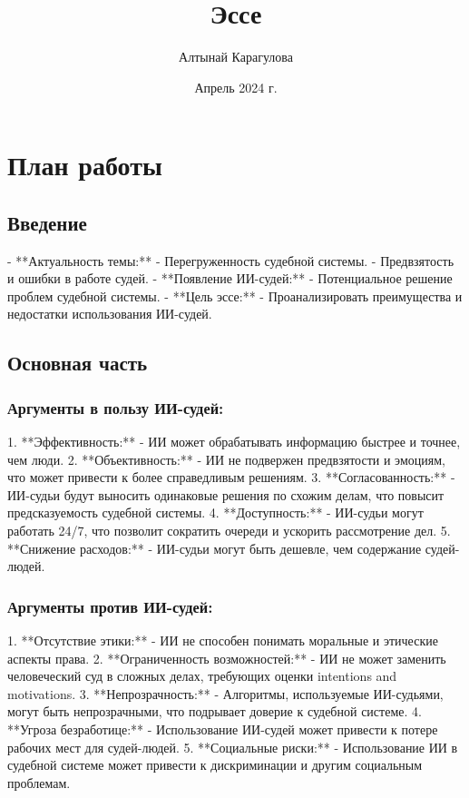 \documentclass{article}
\title{Эссе}
\author{Алтынай Карагулова}
\date{Апрель 2024 г.}
\begin{document}
\section{План работы}

\subsection{Введение}

- **Актуальность темы:**
    - Перегруженность судебной системы.
    - Предвзятость и ошибки в работе судей.
- **Появление ИИ-судей:**
    - Потенциальное решение проблем судебной системы.
- **Цель эссе:**
    - Проанализировать преимущества и недостатки использования ИИ-судей.

\subsection{Основная часть}

\subsubsection{Аргументы в пользу ИИ-судей:}

1. **Эффективность:**
    - ИИ может обрабатывать информацию быстрее и точнее, чем люди.
2. **Объективность:**
    - ИИ не подвержен предвзятости и эмоциям, что может привести к более справедливым решениям.
3. **Согласованность:**
    - ИИ-судьи будут выносить одинаковые решения по схожим делам, что повысит предсказуемость судебной системы.
4. **Доступность:**
    - ИИ-судьи могут работать 24/7, что позволит сократить очереди и ускорить рассмотрение дел.
5. **Снижение расходов:**
    - ИИ-судьи могут быть дешевле, чем содержание судей-людей.

\subsubsection{Аргументы против ИИ-судей:}

1. **Отсутствие этики:**
    - ИИ не способен понимать моральные и этические аспекты права.
2. **Ограниченность возможностей:**
    - ИИ не может заменить человеческий суд в сложных делах, требующих оценки intentions and motivations.
3. **Непрозрачность:**
    - Алгоритмы, используемые ИИ-судьями, могут быть непрозрачными, что подрывает доверие к судебной системе.
4. **Угроза безработице:**
    - Использование ИИ-судей может привести к потере рабочих мест для судей-людей.
5. **Социальные риски:**
    - Использование ИИ в судебной системе может привести к дискриминации и другим социальным проблемам.
\end{document}
